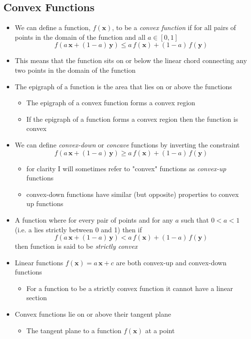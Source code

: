 \documentclass[11pt]{article}
\begin{document}
\subsection{Convex Functions}
\label{sec:org4ebd56a}
\begin{itemize}
\item We can define a function, \(f(\bm{x})\), to be a \emph{convex function}
if for all pairs of points in the domain of the function and all
\(a\in[0,1]\) $$ f(a \,\bm{x} + (1-a)\, \bm{y}) \leq a \,
     f(\bm{x}) + (1-a) \, f(\bm{y}) $$
\item This means that the function sits on or below the linear chord
connecting any two points in the domain of the function
\item The epigraph of a function is the area that lies on or above the
functions
\begin{itemize}
\item The epigraph of a convex function forms a convex region
\item If the epigraph of a function forms a convex region then the
function is convex
\end{itemize}
\item We can define \emph{convex-down} or \emph{concave} functions by inverting the constraint
$$  f(a \,\bm{x} + (1-a)\, \bm{y}) \geq  a \, f(\bm{x}) + (1-a) \, f(\bm{y}) $$
\begin{itemize}
\item for clarity I will sometimes refer to "convex" functions as
\emph{convex-up} functions
\item convex-down functions have similar (but opposite) properties to
convex up functions
\end{itemize}
\item A function where for every pair of points and for any \(a\) such
that \(0<a<1\) (i.e. a lies strictly between 0 and 1) then if
$$  f(a \,\bm{x} + (1-a)\, \bm{y}) < a \, f(\bm{x}) + (1-a) \, f(\bm{y}) $$
then function is said to be \emph{strictly convex}
\item Linear functions \(f(\bm{x}) = a\,\bm{x} +c\) are both convex-up
and convex-down functions
\begin{itemize}
\item For a function to be a strictly convex function it cannot have
a linear section
\end{itemize}
\item Convex functions lie on or above their tangent plane
\begin{itemize}
\item The tangent plane to a function \(f(\bm{x})\) at a point

\end{itemize}
\end{itemize}
\end{document}
